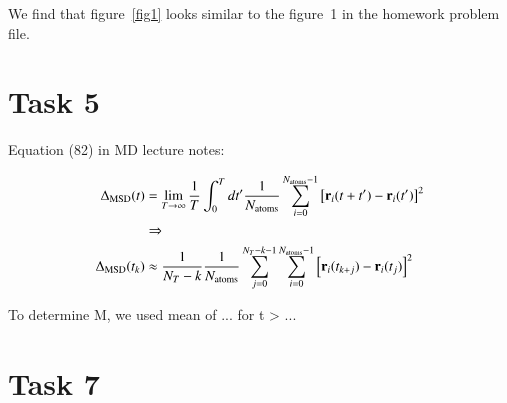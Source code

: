 We find that figure~\ref{fig1} looks similar to the figure~1 in the homework problem file. 

\section*{Task 5}
Equation (82) in MD lecture notes:


\begin{align}
\Delta_{\rm MSD}(t) &= \lim_{T \rightarrow \infty} \frac{1}{T} \int_0^{T} d t' \frac{1}{N_{\rm atoms}} \sum_{i=0}^{N_{\rm atoms}-1} \left[{\bf r}_i(t+t') - {\bf r}_i(t') \right]^2 \\ &\Rightarrow \nonumber
\\
\Delta_{\rm MSD}(t_k) &\approx
\frac{1}{N_T -k}\frac{1}{N_{\rm atoms}} \sum_{j=0}^{N_T-k-1} \sum_{i=0}^{N_{\rm atoms}-1} \left[{\bf r}_i(t_{k+j}) - {\bf r}_i(t_j) \right]^2 
\end{align}

To determine M, we used mean of ... for t  > ...


\section*{Task 7}


